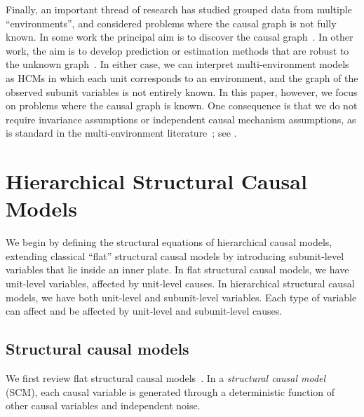 \documentclass[12pt]{article}
\begin{document}
Finally, an important thread of research has studied grouped data from
multiple ``environments'', and considered problems where the causal graph is not fully known.
In some work the principal aim is to discover the causal graph~\citep[Chapters 2,4][]{Peters2017-ww,Tian2013-kn,Peters2015-uw,Perry2022-ah,Guo2022-bl}.
In other work, the aim is to develop prediction or estimation methods that are robust to the unknown graph~\citep{Arjovsky2019-bx,Yin2021-ma,Shi2020-cm,Krueger2020-ik}.
In either case, we can interpret multi-environment models as HCMs in which each unit corresponds to an environment, and the graph of the observed subunit variables is not entirely known.
In this paper, however, we focus on problems where the causal graph is known.
One consequence is that we do not require invariance assumptions or independent causal mechanism assumptions, as is standard in the multi-environment literature~\citep[Chapters 2,4][]{Peters2017-ww,Peters2015-uw}; see .












 \section{Hierarchical Structural Causal Models}
\label{sec:hscm}

We begin by defining the structural equations of hierarchical causal models, extending classical ``flat'' structural causal models by introducing subunit-level variables that lie inside an inner plate.  In flat structural causal models, we have unit-level variables, affected by unit-level causes.  In hierarchical structural causal models, we have both unit-level and subunit-level variables. Each type of variable can affect and be affected by unit-level and subunit-level causes.

\subsection{Structural causal models}
\label{sec:intro-scm}

We first review flat structural causal models~\citep{Pearl2009-fh,Peters2017-ww}.  In a \textit{structural causal model} (SCM), each causal variable is generated through a deterministic function of other causal variables and independent noise.
\end{document}
